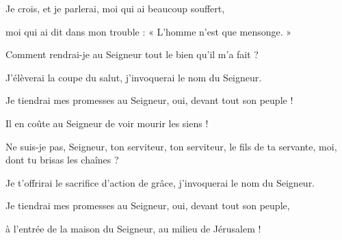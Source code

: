 \item Je crois, et je parlerai, moi qui ai beaucoup souffert,

\item moi qui ai dit dans mon trouble : « L'homme n'est que mensonge. »

\item Comment rendrai-je au Seigneur tout le bien qu'il m'a fait ?

\item J'élèverai la coupe du salut, j'invoquerai le nom du Seigneur.

\item Je tiendrai mes promesses au Seigneur, oui, devant tout son peuple !

\item Il en coûte au Seigneur de voir mourir les siens !

\item Ne suis-je pas, Seigneur, ton serviteur, ton serviteur, le fils de ta servante, moi, dont tu brisas les chaînes ?

\item Je t'offrirai le sacrifice d'action de grâce, j'invoquerai le nom du Seigneur.

\item Je tiendrai mes promesses au Seigneur, oui, devant tout son peuple,

\item à l'entrée de la maison du Seigneur, au milieu de Jérusalem !
